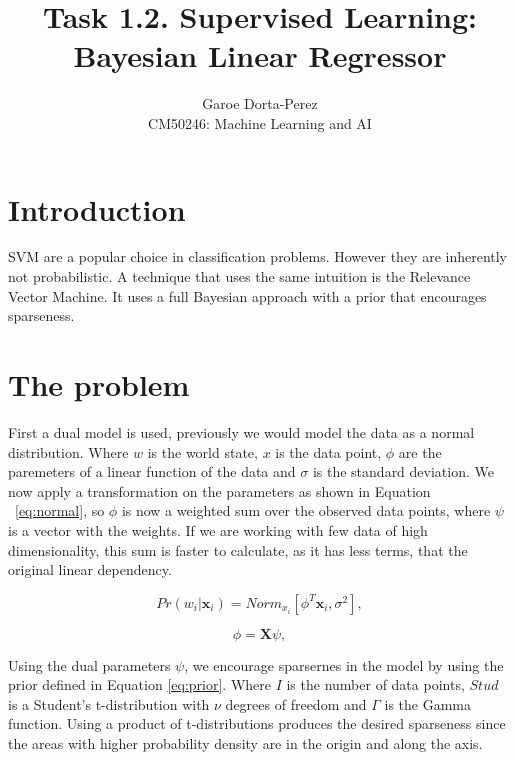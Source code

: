 \documentclass[12pt]{article}
\begin{document}
  
\title{Task 1.2. Supervised Learning: Bayesian Linear Regressor}
\author{Garoe Dorta-Perez\\
CM50246: Machine Learning and AI}
 
\maketitle
 
\section{Introduction}
 
SVM  are a popular choice in classification problems.
However they are inherently not probabilistic.
A technique that uses the same intuition is the Relevance Vector Machine.
It uses a full Bayesian approach with a prior that encourages sparseness.

\section{The problem}

First a dual model is used, previously we would model the data as a normal distribution.
Where $w$ is the world state, $x$ is the data point, $\phi$ are the paremeters of a linear function of the data and $\sigma$ is the standard deviation.
We now apply a transformation on the parameters as shown in Equation ~\ref{eq:normal}, so $\phi$ is now a weighted sum over the observed data points, where $\psi$ is a vector with the weights.
If we are working with few data of high dimensionality, this sum is faster to calculate, as it has less terms, that the original linear dependency.

\begin{equation}
\label{eq:normal}
Pr(w_i|\mathbf{x}_i) = Norm_{x_i}[\phi^T \mathbf{x}_i, \sigma^2],
\end{equation}

\begin{equation}
\label{eq:dual}
\phi = \mathbf{X} \psi,
\end{equation}

Using the dual parameters $\psi$, we encourage sparsernes in the model by using the prior defined in Equation \ref{eq:prior}.
Where $I$ is the number of data points, $Stud$ is a Student's t-distribution with $\nu$ degrees of freedom and $\Gamma$ is the Gamma function.
Using a product of t-distributions produces the desired sparseness since the areas with higher probability density are in the origin and along the axis.
\end{document}
